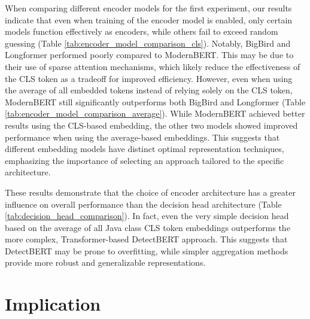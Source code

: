 When comparing different encoder models for the first experiment, 
our results indicate that even when training of the encoder model is enabled, 
only certain models function effectively as encoders, 
while others fail to exceed random guessing (Table \ref{tab:encoder_model_comparison_cls}).
Notably, BigBird and Longformer performed poorly compared to ModernBERT.
This may be due to their use of sparse attention mechanisms, 
which likely reduce the effectiveness of the CLS token as a tradeoff for improved efficiency.
However, even when using the average of all embedded tokens instead of relying solely on the CLS token, 
ModernBERT still significantly outperforms both BigBird and Longformer (Table \ref{tab:encoder_model_comparison_average}).
While ModernBERT achieved better results using the CLS-based embedding, 
the other two models showed improved performance when using the average-based embeddings.
This suggests that different embedding models have distinct optimal representation techniques, 
emphasizing the importance of selecting an approach tailored to the specific architecture.

These results demonstrate that the choice of encoder architecture has a greater influence on overall 
performance than the decision head architecture (Table \ref{tab:decision_head_comparison}).
In fact, even the very simple decision head based on the average of all Java class CLS token 
embeddings outperforms the more complex, Transformer-based DetectBERT approach.
This suggests that DetectBERT may be prone to overfitting, while simpler aggregation methods provide more 
robust and generalizable representations.


\section{Implication}
\label{sec:implication}

